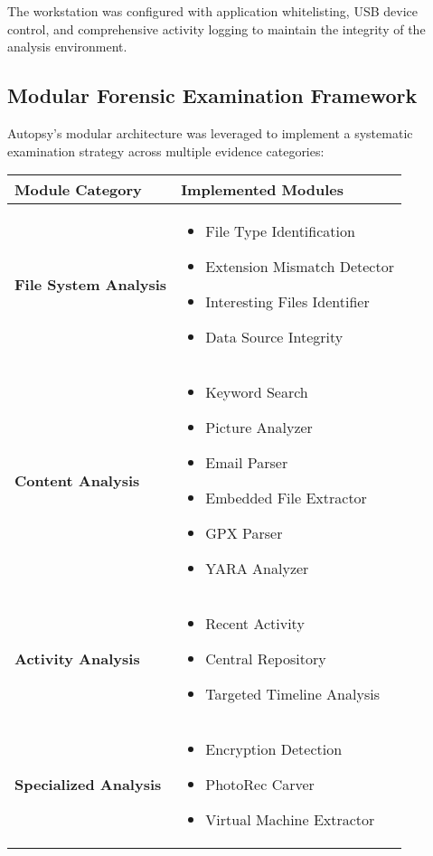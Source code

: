 The workstation was configured with application whitelisting, USB device control, and comprehensive activity logging to maintain the integrity of the analysis environment.

\subsection{Modular Forensic Examination Framework}
Autopsy's modular architecture was leveraged to implement a systematic examination strategy across multiple evidence categories:

\begin{table}[htbp]
\centering
\begin{tabular}{|p{5cm}|p{10cm}|}
\hline
\textbf{Module Category} & \textbf{Implemented Modules} \\
\hline
\textbf{File System Analysis} & 
\begin{itemize}
    \item File Type Identification
    \item Extension Mismatch Detector
    \item Interesting Files Identifier
    \item Data Source Integrity
\end{itemize} \\
\hline
\textbf{Content Analysis} & 
\begin{itemize}
    \item Keyword Search
    \item Picture Analyzer
    \item Email Parser
    \item Embedded File Extractor
    \item GPX Parser
    \item YARA Analyzer
\end{itemize} \\
\hline
\textbf{Activity Analysis} & 
\begin{itemize}
    \item Recent Activity
    \item Central Repository
    \item Targeted Timeline Analysis
\end{itemize} \\
\hline
\textbf{Specialized Analysis} & 
\begin{itemize}
    \item Encryption Detection
    \item PhotoRec Carver
    \item Virtual Machine Extractor

\end{itemize}
\end{tabular}
\end{table}
